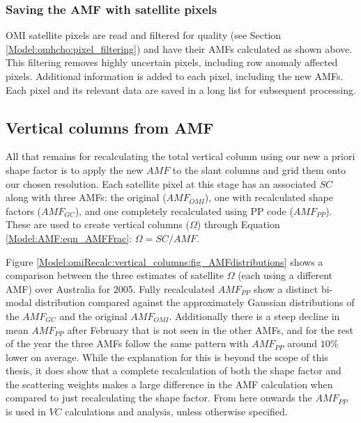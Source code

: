     
    \subsubsection{Saving the AMF with satellite pixels}
      
      OMI satellite pixels are read and filtered for quality (see Section \ref{Model:omhcho:pixel_filtering}) and have their AMFs calculated as shown above. 
      This filtering removes highly uncertain pixels, including row anomaly affected pixels.
      Additional information is added to each pixel, including the new AMFs.
      Each pixel and its relevant data are saved in a long list for subsequent processing.
    
  \subsection{Vertical columns from AMF}
    \label{Model:omiRecalc:vertical_columns}
    All that remains for recalculating the total vertical column using our new a priori shape factor is to apply the new $AMF$ to the slant columns and grid them onto our chosen resolution.
    Each satellite pixel at this stage has an associated $SC$ along with three AMFs: the original ($AMF_{OMI}$), one with recalculated shape factors ($AMF_{GC}$), and one completely recalculated using PP code ($AMF_{PP}$).
    These are used to create vertical columns ($\Omega$) through Equation \ref{Model:AMF:eqn_AMFFrac}: $\Omega = SC/AMF$.
    
    Figure \ref{Model:omiRecalc:vertical_columns:fig_AMFdistributions} shows a comparison between the three estimates of satellite $\Omega$ (each using a different AMF) over Australia for 2005. 
    Fully recalculated $AMF_{PP}$ show a distinct bi-modal distribution compared against the approximately Gaussian distributions of the $AMF_{GC}$ and the original $AMF_{OMI}$.
    Additionally there is a steep decline in mean $AMF_{PP}$ after February that is not seen in the other AMFs, and for the rest of the year the three AMFs follow the same pattern with $AMF_{PP}$ around $10\%$ lower on average.
    While the explanation for this is beyond the scope of this thesis, it does show that a complete recalculation of both the shape factor and the scattering weights makes a large difference in the AMF calculation when compared to just recalculating the shape factor.
    From here onwards the $AMF_{PP}$ is used in $VC$ calculations and analysis, unless otherwise specified.
    
